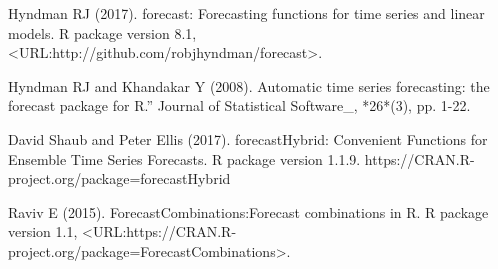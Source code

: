 Hyndman RJ (2017). 
\newblock forecast: Forecasting functions for time series and linear models. 
\newblock R package version 8.1, <URL:http://github.com/robjhyndman/forecast>.

Hyndman RJ and Khandakar Y (2008).
\newblock Automatic time series forecasting: the forecast package for R.” 
\newblock Journal of Statistical Software_, *26*(3), pp. 1-22.

David Shaub and Peter Ellis (2017).
\newblock forecastHybrid: Convenient Functions for Ensemble Time Series Forecasts. 
\newblock R package version 1.1.9. https://CRAN.R-project.org/package=forecastHybrid

Raviv E (2015). 
\newblock ForecastCombinations:Forecast combinations in R. 
\newblock R package version 1.1, <URL:https://CRAN.R-project.org/package=ForecastCombinations>.

